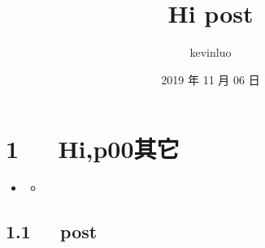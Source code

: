 \documentclass[letterpaper,12pt,english]{sphinxmanual}
\title{Hi post}
\date{2019 年 11 月 06 日}
\author{kevinluo}
\begin{document}
\pagestyle{empty}
\sphinxmaketitle
\pagestyle{plain}
\sphinxtableofcontents
\pagestyle{normal}
\label{\detokenize{index::doc}}



\chapter{1   Hi,p00其它}
\label{\detokenize{p00_u5176_u5b83/Hello_uff0cp00_u5176_u5b83:hi-p00}}\label{\detokenize{p00_u5176_u5b83/Hello_uff0cp00_u5176_u5b83::doc}}
\begin{sphinxShadowBox}
\begin{itemize}
\item {} 
\label{\detokenize{p00_u5176_u5b83/Hello_uff0cp00_u5176_u5b83:id2}}{\hyperref[\detokenize{p00_u5176_u5b83/Hello_uff0cp00_u5176_u5b83:hi-p00}]{}}
\begin{itemize}
\item {} 
\label{\detokenize{p00_u5176_u5b83/Hello_uff0cp00_u5176_u5b83:id3}}{\hyperref[\detokenize{p00_u5176_u5b83/Hello_uff0cp00_u5176_u5b83:post}]{}}

\end{itemize}

\end{itemize}
\end{sphinxShadowBox}


\section{1.1   post}
\label{\detokenize{p00_u5176_u5b83/Hello_uff0cp00_u5176_u5b83:post}}
\end{document}
